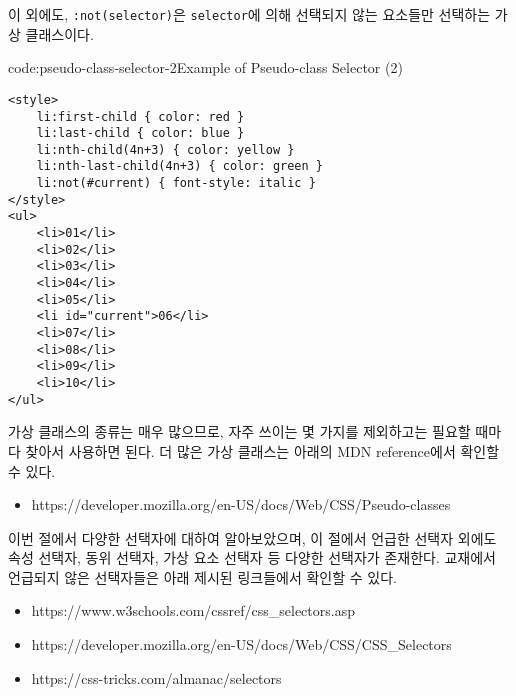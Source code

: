 이 외에도, \texttt{:not(selector)}은 \texttt{selector}에 의해 선택되지 않는 요소들만 선택하는 가상 클래스이다.

\begin{codeenv}{code:pseudo-class-selector-2}{Example of Pseudo-class Selector (2)}\begin{verbatim}
<style>
    li:first-child { color: red }
    li:last-child { color: blue }
    li:nth-child(4n+3) { color: yellow }
    li:nth-last-child(4n+3) { color: green }
    li:not(#current) { font-style: italic }
</style>
<ul>
    <li>01</li>
    <li>02</li>
    <li>03</li>
    <li>04</li>
    <li>05</li>
    <li id="current">06</li>
    <li>07</li>
    <li>08</li>
    <li>09</li>
    <li>10</li>
</ul>
\end{verbatim}
\end{codeenv}

가상 클래스의 종류는 매우 많으므로, 자주 쓰이는 몇 가지를 제외하고는 필요할 때마다 찾아서 사용하면 된다. 더 많은 가상 클래스는 아래의 MDN reference에서 확인할 수 있다.

\begin{itemize}
    \item https://developer.mozilla.org/en-US/docs/Web/CSS/Pseudo-classes
\end{itemize}

이번 절에서 다양한 선택자에 대하여 알아보았으며, 이 절에서 언급한 선택자 외에도 속성 선택자, 동위 선택자, 가상 요소 선택자 등 다양한 선택자가 존재한다. 교재에서 언급되지 않은 선택자들은 아래 제시된 링크들에서 확인할 수 있다.

\begin{itemize}
    \item https://www.w3schools.com/cssref/css\_selectors.asp
    \item https://developer.mozilla.org/en-US/docs/Web/CSS/CSS\_Selectors
    \item https://css-tricks.com/almanac/selectors
\end{itemize}
